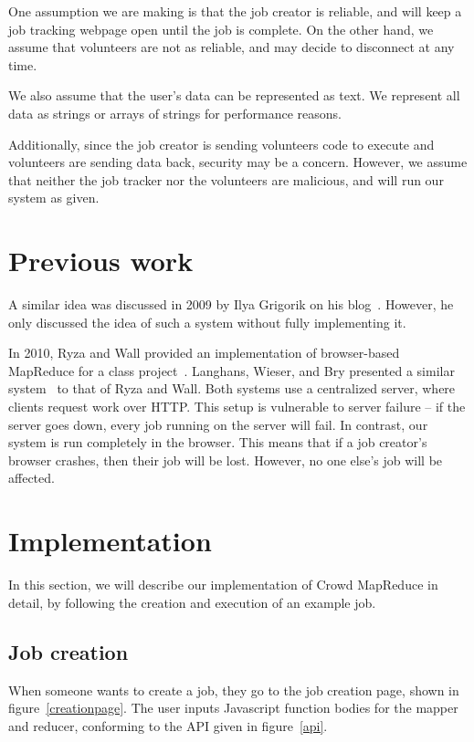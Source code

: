 \documentclass{article} %
\begin{document}
One assumption we are making is that the job creator is reliable, and will keep
a job tracking webpage open until the job is complete. On the other hand, we
assume that volunteers are not as reliable, and may decide to disconnect at any
time.

We also assume that the user's data can be represented as text. We represent all
data as strings or arrays of strings for performance reasons.

Additionally, since the job creator is sending volunteers code to execute and
volunteers are sending data back, security may be a concern. However, we assume
that neither the job tracker nor the volunteers are malicious, and will run our
system as given.

\section{Previous work}
A similar idea was discussed in 2009 by Ilya Grigorik on his
blog~\cite{grigorik2009}. However, he only discussed the idea of such a system
without fully implementing it.

In 2010, Ryza and Wall provided an implementation of browser-based MapReduce for
a class project~\cite{mrjs}.
Langhans, Wieser, and Bry presented a similar
system~\cite{langhans2013crowdsourcing} to that of Ryza and Wall. Both systems use a centralized server, where clients request work over HTTP. This setup is
vulnerable to server failure -- if the server goes down, every job running on
the server will fail. In contrast, our system is run completely in the browser.
This means that if a job creator's browser crashes, then their job will be lost.
However, no one else's job will be affected.

\section{Implementation}
In this section, we will describe our implementation of Crowd MapReduce in
detail, by following the creation and execution of an example job.

\subsection{Job creation}
When someone wants to create a job, they go to the job creation page, shown in
figure~\ref{creationpage}. The user inputs Javascript function bodies for the
mapper and reducer, conforming to the API given in figure~\ref{api}.
\end{document}
